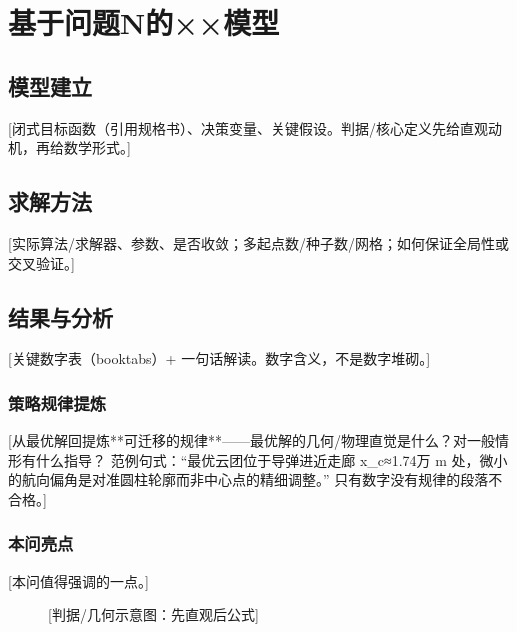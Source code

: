 
\section{基于问题N的××模型}   %

\subsection{模型建立}
[闭式目标函数（引用规格书）、决策变量、关键假设。判据/核心定义先给直观动机，再给数学形式。]

\subsection{求解方法}
[实际算法/求解器、参数、是否收敛；多起点数/种子数/网格；如何保证全局性或交叉验证。]

\subsection{结果与分析}
[关键数字表（booktabs）+ 一句话解读。数字含义，不是数字堆砌。]

\subsubsection{策略规律提炼}
[从最优解回提炼**可迁移的规律**——最优解的几何/物理直觉是什么？对一般情形有什么指导？
范例句式：“最优云团位于导弹进近走廊 x_c≈1.74万 m 处，微小的航向偏角是对准圆柱轮廓而非中心点的精细调整。”
只有数字没有规律的段落不合格。]

\subsubsection{本问亮点}
[本问值得强调的一点。]

\begin{figure}[H]
\centering
\caption{[判据/几何示意图：先直观后公式]}\label{fig:scheme}
\end{figure}
